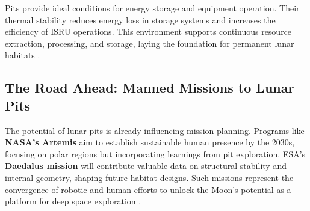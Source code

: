 Pits provide ideal conditions for energy storage and equipment operation. Their thermal stability reduces energy loss in storage systems and increases the efficiency of ISRU operations. This environment supports continuous resource extraction, processing, and storage, laying the foundation for permanent lunar habitats \cite{thermal-lunar-pits, jsanders-isru}.

\subsection{The Road Ahead: Manned Missions to Lunar Pits}

The potential of lunar pits is already influencing mission planning. Programs like \textbf{NASA’s Artemis} aim to establish sustainable human presence by the 2030s, focusing on polar regions but incorporating learnings from pit exploration. ESA’s \textbf{Daedalus mission} will contribute valuable data on structural stability and internal geometry, shaping future habitat designs. Such missions represent the convergence of robotic and human efforts to unlock the Moon’s potential as a platform for deep space exploration \cite{Carrer2024, jsanders-isru}.